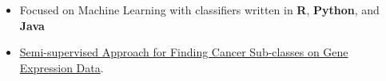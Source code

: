 \documentclass[10pt,a4paper,ragged2e,withhyper]{altacv}
\begin{document}
\begin{paracol}{2}

\begin{itemize}
  \item Focused on Machine Learning with classifiers written in \textbf{R}, \textbf{Python}, and \textbf{Java}
  \item \href{https://link.springer.com/chapter/10.1007/978-3-642-15060-9_3}{Semi-supervised Approach for Finding Cancer Sub-classes on Gene Expression Data}.
\end{itemize}

\divider


\newpage





\end{paracol}
\end{document}
